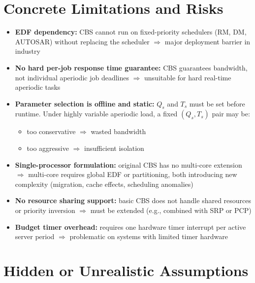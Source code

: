 \documentclass[conference]{IEEEtran}
\begin{document}
\section{Concrete Limitations and Risks}

\begin{itemize}
  \item \textbf{EDF dependency:}
        CBS cannot run on fixed-priority schedulers (RM, DM, AUTOSAR)
        without replacing the scheduler $\Rightarrow$ major deployment
        barrier in industry
  \item \textbf{No hard per-job response time guarantee:}
        CBS guarantees bandwidth, not individual aperiodic job deadlines
        $\Rightarrow$ unsuitable for hard real-time aperiodic tasks
  \item \textbf{Parameter selection is offline and static:}
        $Q_s$ and $T_s$ must be set before runtime. Under highly
        variable aperiodic load, a fixed $(Q_s, T_s)$ pair may be:
        \begin{itemize}
          \item too conservative $\Rightarrow$ wasted bandwidth
          \item too aggressive $\Rightarrow$ insufficient isolation
        \end{itemize}
  \item \textbf{Single-processor formulation:}
        original CBS has no multi-core extension $\Rightarrow$
        multi-core requires global EDF or partitioning, both introducing
        new complexity (migration, cache effects, scheduling anomalies)
  \item \textbf{No resource sharing support:}
        basic CBS does not handle shared resources or priority inversion
        $\Rightarrow$ must be extended (e.g., combined with SRP or PCP)
  \item \textbf{Budget timer overhead:}
        requires one hardware timer interrupt per active server period
        $\Rightarrow$ problematic on systems with limited timer hardware
\end{itemize}

\section{Hidden or Unrealistic Assumptions}
\end{document}
